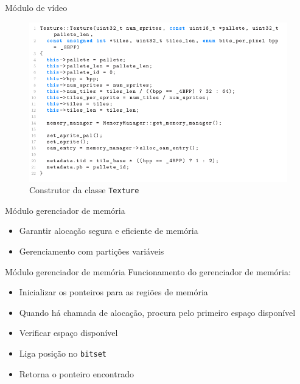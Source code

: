 \documentclass[notes, mathserif]{beamer}
\begin{document}
\begin{frame}{M\'odulo de v\'ideo}
	\begin{figure}[H]
		\includegraphics[width=.8\linewidth]{figuras/construtor-texture.png}
		\centering
		\caption{Construtor da classe \texttt{Texture}}
		\label{fig:inputdemocode}
	\end{figure}
\end{frame}

\begin{frame}{M\'odulo gerenciador de mem\'oria}
	\begin{itemize}
		\item Garantir aloca\c c\~ao segura e eficiente de mem\'oria
		\item Gerenciamento com parti\c c\~oes vari\'aveis
	\end{itemize}
\end{frame}

\begin{frame}{M\'odulo gerenciador de mem\'oria}
	Funcionamento do gerenciador de mem\'oria:
	\begin{itemize}
		\item Inicializar os ponteiros para as regi\~oes de mem\'oria
		\item Quando h\'a chamada de aloca\c c\~ao, procura pelo primeiro espa\c co dispon\'ivel
		\item Verificar espa\c co dispon\'ivel
		\item Liga posi\c c\~ao no \texttt{bitset}
		\item Retorna o ponteiro encontrado
	\end{itemize}
\end{frame}
\end{document}
